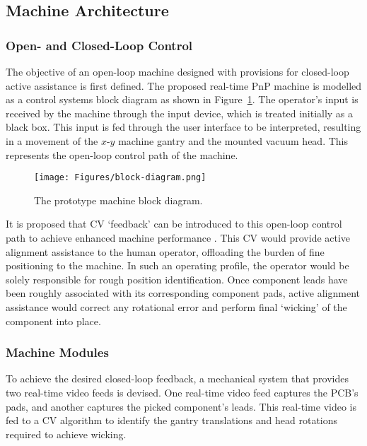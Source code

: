 \documentclass[12pt,british,UKenglish]{article}
\begin{document}

\subsection{Machine Architecture}

\subsubsection{Open- and Closed-Loop Control}

The objective of an open-loop machine designed with provisions for closed-loop active assistance is first defined.
The proposed real-time \acl{PnP} machine is modelled as a control systems block diagram as shown in Figure~\ref{fig:block-diagram}.
The operator's input is received by the machine through the input device, which is treated initially as a black box.
This input is fed through the user interface to be interpreted, resulting in a movement of the $x$-$y$ machine gantry and the mounted vacuum head.
This represents the open-loop control path of the machine.
\begin{figure}[hbtp]
    \texttt{[image: Figures/block-diagram.png]}
    \centering
    \caption{The prototype machine block diagram.}
    \label{fig:block-diagram}
\end{figure}

It is proposed that \ac{CV} `feedback' can be introduced to this open-loop control path to achieve enhanced machine performance \cite{AMAT2002473}.
This \ac{CV} would provide active alignment assistance to the human operator, offloading the burden of fine positioning to the machine.
In such an operating profile, the operator would be solely responsible for rough position identification.
Once component leads have been roughly associated with its corresponding component pads, active alignment assistance would correct any rotational error and perform final `wicking' of the component into place.

\subsubsection{Machine Modules}

To achieve the desired closed-loop feedback, a mechanical system that provides two real-time video feeds is devised.
One real-time video feed captures the \ac{PCB}'s pads, and another captures the picked component's leads.
This real-time video is fed to a \ac{CV} algorithm to identify the gantry translations and head rotations required to achieve wicking.
\end{document}
